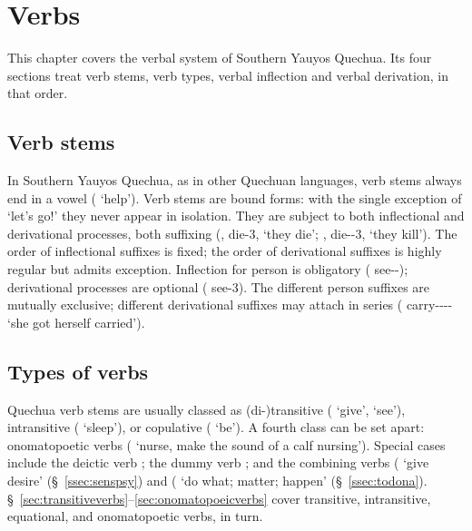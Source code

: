\chapter{Verbs}\label{ch:verbs}
This chapter covers the verbal system of Southern Yauyos Quechua. Its four sections treat verb stems, verb types, verbal inflection and verbal derivation, in that order.

\section{Verb stems}\label{sec:verbstem}
In Southern Yauyos Quechua, as in other Quechuan languages, verb stems always end in a vowel ( `help'). Verb stems are bound forms: with the single exception of  `let's go!' they never appear in isolation. They are subject to both inflectional and derivational processes, both suffixing (, die-3, `they die'; , die--3, `they kill'). The order of inflectional suffixes is fixed; the order of derivational suffixes is highly regular but admits exception. Inflection for person is obligatory ( see--); derivational processes are optional ( see-3). The different person suffixes are mutually exclusive; different derivational suffixes may attach in series ( carry---- `she got herself carried').

\section{Types of verbs}
Quechua verb stems are usually classed as (di-)transitive ( `give',  `see'), intransitive ( `sleep'), or copulative ( `be'). A fourth class can be set apart: onomatopoetic verbs ( `nurse, make the sound of a calf nursing'). Special cases include the deictic verb ; the dummy verb ; and the combining verbs ( `give desire' (\S~\ref{ssec:senspsy}) and ( `do what; matter; happen' (\S~\ref{ssec:todona}). \S~\ref{sec:transitiveverbs}--\ref{sec:onomatopoeicverbs} cover transitive, intransitive, equational, and onomatopoetic verbs, in turn.

